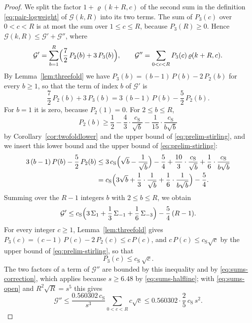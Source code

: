\documentclass{amsart}
\theoremstyle{definition}
\theoremstyle{remark}
\numberwithin{equation}{section}
\begin{document}
\begin{proof}
We split the factor $1+\varrho(k+R,c)$ of the second sum in the definition
\eqref{eq:pair-logweight} of $\mathcal G(k,R)$ into its two terms. The sum
of $P_3(c)$ over $0<c<R$ is at most the sum over $1\le c\le R$, because
$P_3(R)\ge0$. Hence
$\mathcal G(k,R)\le\mathcal G'+\mathcal G''$, where
\[
\mathcal G'=\sum_{b=1}^{R}\Bigl(\frac72\,P_2(b)+3\,P_3(b)\Bigr),\qquad
\mathcal G''=\sum_{0<c<R}P_3(c)\,\varrho(k+R,c).
\]
By Lemma~\ref{lem:threefold} we have $P_3(b)=(b-1)\,P(b)-2\,P_2(b)$ for
every $b\ge1$, so that the term of index $b$ of $\mathcal G'$ is
\[
\frac72\,P_2(b)+3\,P_3(b)=3\,(b-1)\,P(b)-\frac52\,P_2(b).
\]
For $b=1$ it is zero, because $P_2(1)=0$. For $2\le b\le R$,
\[
P_2(b)\ge\frac12-\frac43\cdot\frac{c_{\mathrm S}}{\sqrt b}
-\frac1{15}\cdot\frac{c_{\mathrm S}}{b\sqrt b}
\]
by Corollary~\ref{cor:twofoldlower} and the upper bound of
\eqref{eq:prelim-stirling}, and we insert this lower bound and the upper
bound of \eqref{eq:prelim-stirling}:
\begin{align*}
3\,(b-1)\,P(b)-\frac52\,P_2(b)
&\le3\,c_{\mathrm S}\Bigl(\sqrt b-\frac1{\sqrt b}\Bigr)-\frac54
+\frac{10}3\cdot\frac{c_{\mathrm S}}{\sqrt b}
+\frac16\cdot\frac{c_{\mathrm S}}{b\sqrt b}\\
&=c_{\mathrm S}\Bigl(3\sqrt b+\frac13\cdot\frac1{\sqrt b}
+\frac16\cdot\frac1{b\sqrt b}\Bigr)-\frac54 .
\end{align*}
Summing over the $R-1$ integers $b$ with $2\le b\le R$, we obtain
\[
\mathcal G'\le c_{\mathrm S}\Bigl(3\,\Sigma_1+\frac13\,\Sigma_{-1}
+\frac16\,\Sigma_{-3}\Bigr)-\frac54\,(R-1).
\]
For every integer $c\ge1$, Lemma~\ref{lem:threefold} gives
$P_3(c)=(c-1)\,P(c)-2\,P_2(c)\le c\,P(c)$, and
$c\,P(c)\le c_{\mathrm S}\sqrt c$ by the upper bound of
\eqref{eq:prelim-stirling}, so that
\[
P_3(c)\le c_{\mathrm S}\,\sqrt c .
\]
The two factors of a term of $\mathcal G''$ are bounded by this inequality
and by \eqref{eq:sums-correction}, which applies because $s\ge6.48$ by
\eqref{eq:sums-halfline}; with
\eqref{eq:sums-open} and $R^2\sqrt R=s^5$ this gives
\[
\mathcal G''\le\frac{0.560302\,c_{\mathrm S}}{s^3}\sum_{0<c<R}c\sqrt c
\le0.560302\cdot\frac25\,c_{\mathrm S}\,s^2 .
\]


\end{proof}
\end{document}
